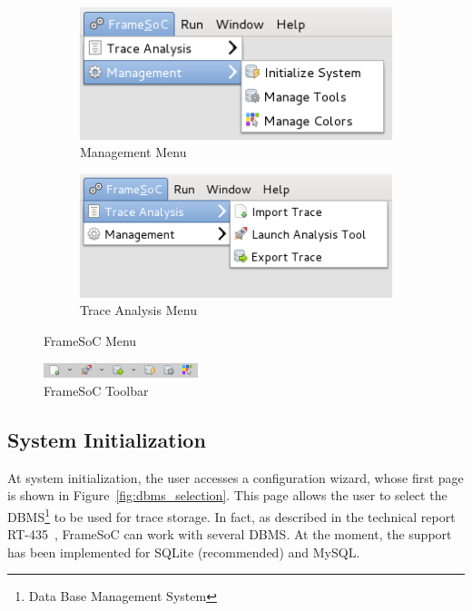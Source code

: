 \documentclass[twoside]{article}
\begin{document}
\begin{sloppypar}
\begin{figure}[h!]
  \centering
  \begin{subfigure}[c]{0.45\textwidth}
    \includegraphics[width=1.0\textwidth]{images/menu_management.png}
    \caption{Management Menu}
    \label{fig:menu_management}
  \end{subfigure}
  \hspace{30pt}
  \begin{subfigure}[c]{0.45\textwidth}
    \includegraphics[width=1.0\textwidth]{images/menu_trace_analysis.png}
    \caption{Trace Analysis Menu}
    \label{fig:menu_trace_analysis}
  \end{subfigure}
  \caption{FrameSoC Menu}
  \label{fig:menu}
\end{figure}

\begin{figure}[h!]
  \centering
    \includegraphics[width=0.4\textwidth]{images/toolbar.png}
  \caption{FrameSoC Toolbar}
  \label{fig:toolbar}
\end{figure}

\subsection{System Initialization}
\label{subsec:init}

At system initialization, the user accesses a configuration wizard, whose first page is shown in Figure~\ref{fig:dbms_selection}. 
This page allows the user to select the DBMS\footnote{Data Base Management System} to be used for trace storage.
In fact, as described in the technical report RT-435~\cite{pagano:hal-00830008}, FrameSoC can work with several DBMS.
At the moment, the support has been implemented for SQLite (recommended) and MySQL.


\end{sloppypar}
\end{document}
